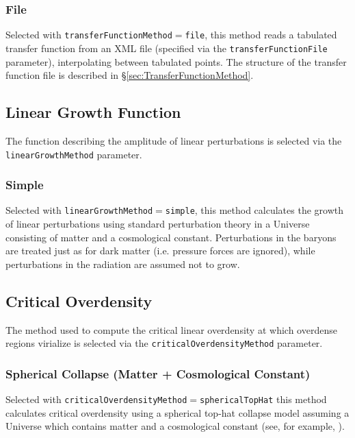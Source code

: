 \subsubsection{File}

Selected with {\tt transferFunctionMethod}$=${\tt file}, this method reads a tabulated transfer function from an XML file (specified via the {\tt transferFunctionFile} parameter), interpolating between tabulated points. The structure of the transfer function file is described in \S\ref{sec:TransferFunctionMethod}.

\subsection{Linear Growth Function}

The function describing the amplitude of linear perturbations is selected via the {\tt linearGrowthMethod} parameter.

\subsubsection{Simple}

Selected with {\tt linearGrowthMethod}$=${\tt simple}, this method calculates the growth of linear perturbations using standard perturbation theory in a Universe consisting of matter and a cosmological constant. Perturbations in the baryons are treated just as for dark matter (i.e. pressure forces are ignored), while perturbations in the radiation are assumed not to grow.

\subsection{Critical Overdensity}

The method used to compute the critical linear overdensity at which overdense regions virialize is selected via the {\tt criticalOverdensityMethod} parameter.

\subsubsection{Spherical Collapse (Matter + Cosmological Constant)}

Selected with {\tt criticalOverdensityMethod}$=${\tt sphericalTopHat} this method calculates critical overdensity using a spherical top-hat collapse model assuming a Universe which contains matter and a cosmological constant (see, for example, \citealt{percival_cosmological_2005}).

